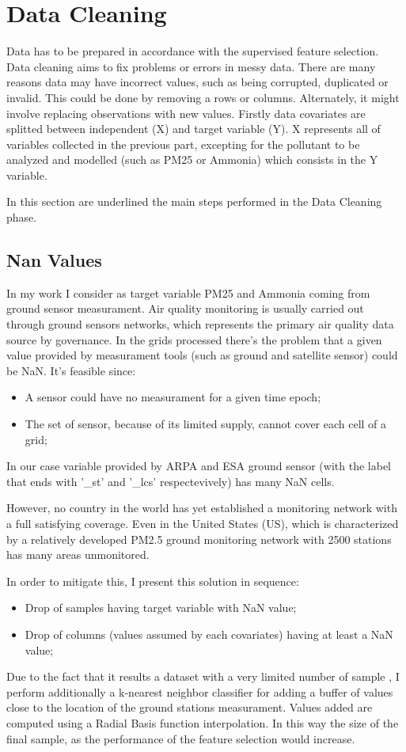 \section{Data Cleaning}
Data has to be prepared in accordance with the supervised feature selection.
Data cleaning aims to fix problems or errors in messy data. There are many reasons data may have incorrect values, such as being corrupted, duplicated or invalid. 
This could be done by removing a rows or columns. Alternately, it might involve replacing observations with new values. 
Firstly data covariates are splitted between independent (X) and target variable (Y). X represents all of variables collected in the previous part, excepting for the pollutant to be analyzed and modelled (such as PM25 or Ammonia) which consists in the Y variable.

In this section are underlined the main steps performed in the Data Cleaning phase.
\subsection{Nan Values}
In my work I consider as target variable PM25 and Ammonia coming from ground sensor measurament.
Air quality monitoring is usually carried out through ground sensors networks, which represents the primary air quality data source by governance. 
In the grids processed there's the problem that a given value provided by measurament tools (such as ground and satellite sensor) could be NaN. 
It's feasible since:
\begin{itemize}
\item A sensor could have no measurament for a given time epoch;
\item The set of sensor, because of its limited supply, cannot cover each cell of a grid;
\end{itemize}
In our case variable provided by ARPA and ESA ground sensor (with the label that ends with '\_st' and '\_lcs' respectevively) has many NaN cells.

However, no country in the world has yet established a monitoring network with a full satisfying coverage\cite{liu2018improve}. Even in the United States (US), which is characterized by a relatively developed PM2.5 ground monitoring network with 2500 stations has many areas unmonitored\cite{liu2018improve}. 

In order to mitigate this, I present this solution in sequence:
\begin{itemize}
\item Drop of samples having target variable with NaN value;
\item Drop of columns (values assumed by each covariates) having at least a NaN value;
\end{itemize}
Due to the fact that it results a dataset with a very limited number of sample \cite{zhang2018strategy}, I perform additionally a k-nearest neighbor classifier\cite{taunk2019brief} for adding a buffer of values close to the location of the ground stations measurament. Values added are computed using a Radial Basis function interpolation\cite{wright2003radial}.
In this way the size of the final sample, as the performance of the feature selection would increase.

